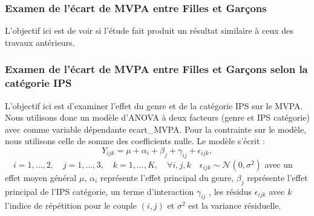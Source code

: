 \documentclass[12pt,a4paper]{article}
\begin{document}
	\subsubsection{Examen de l'écart de MVPA entre Filles et Garçons}
	L'objectif ici est de voir si l'étude fait produit un résultat similaire à ceux des travaux antérieurs.
	\subsubsection{Examen de l'écart de MVPA entre Filles et Garçons selon la catégorie IPS}
	L'objectif ici est d'examiner l'effet du genre et de la catégorie IPS sur le MVPA. Nous utilisons donc un modèle d'ANOVA à deux facteurs (genre et IPS catégorie) avec comme variable dépendante ecart\_MVPA. Pour la contrainte sur le modèle, nous utilisons celle de somme des coefficients nulle.
	Le modèle s'écrit :
	\begin{equation}
		Y_{ijk} = \mu + \alpha_i + \beta_j + \gamma_{ij} + \epsilon_{ijk},
	\end{equation}
	$\quad i = 1, \ldots, 2, \quad j = 1, \ldots, 3, \quad k = 1, \ldots, K, \quad \forall i,j,k \quad \epsilon_{ijk} \sim \mathcal{N}(0,\sigma^2)$
	avec un effet moyen général $\mu$, $\alpha_i$ représente l'effet principal du genre, $\beta_j$ représente l'effet principal de l'IPS catégorie, un terme d'interaction $\gamma_{ij}$ , les résidus $\epsilon_{ijk}$ avec $k$ l'indice de répétition pour le couple $(i,j)$ et $\sigma^2$ est la variance résiduelle. 
	
\end{document}
